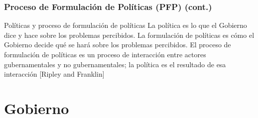 \documentclass[14pt,aspectratio=169]{beamer}
\begin{document}
    
    \begin{frame}\frametitle{Proceso de Formulación de Políticas (PFP) (cont.)}
      \begin{block}{Políticas y proceso de formulación de políticas}
La política es lo que el Gobierno dice y hace sobre los problemas
percibidos. La formulación de políticas es cómo el Gobierno decide qué
se hará sobre los problemas percibidos. El proceso de formulación de
políticas es un proceso de interacción entre actores gubernamentales y
no gubernamentales; la política es el resultado de esa interacción
[Ripley and Franklin]
        \end{block}
      \end{frame}
    
    



  \section{Gobierno}
\end{document}
